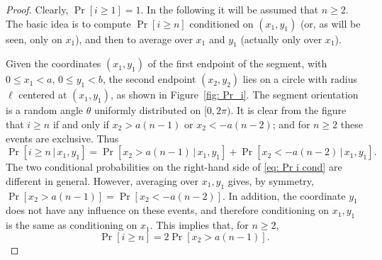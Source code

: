 \documentclass[12pt, a4paper]{article}
\newcommand{\cond}{\,|\,} %
\newcommand{\len}{\ell} %
\begin{document}
\begin{proof}
Clearly, $\Pr[i \geq 1]=1$. In the following it will be assumed that $n \geq 2$. The basic idea is to compute $\Pr[i \geq n]$ conditioned on $(x_1,y_1)$ (or, as will be seen, only on $x_1$), and then to average over $x_1$ and $y_1$ (actually only over $x_1$).

Given the coordinates $(x_1, y_1)$ of the first endpoint of the segment, with $0 \leq x_1 < a$, $0 \leq y_1 < b$, the second endpoint $(x_2, y_2)$ lies on a circle with radius $\len$ centered at $(x_1,y_1)$, as shown in Figure~\ref{fig: Pr_i}. The segment orientation is a random angle $\theta$ uniformly distributed on $[0,2\pi)$. It is clear from the figure that $i \geq n$ if and only if $x_2 > a(n-1)$ or $x_2 < -a(n-2)$; and for $n \geq 2$ these events are exclusive. Thus
\begin{equation}
\label{eq: Pr i cond}
\Pr[i \geq n \cond x_1, y_1] = \Pr[x_2 > a(n-1) \cond x_1, y_1] + \Pr[x_2 < -a(n-2) \cond x_1, y_1].
\end{equation}
The two conditional probabilities on the right-hand side of \eqref{eq: Pr i cond} are different in general. However, averaging over $x_1, y_1$ gives, by symmetry, $\Pr[x_2 > a(n-1)] = \Pr[x_2 < -a(n-2)]$. In addition, the coordinate $y_1$ does not have any influence on these events, and therefore conditioning on $x_1, y_1$ is the same as conditioning on $x_1$. This implies that, for $n \geq 2$,
\begin{equation}
\label{eq: Pr i = 2 Pr}
\Pr[i \geq n] = 2 \Pr[x_2 > a(n-1)].
\end{equation}


\end{proof}
\end{document}
